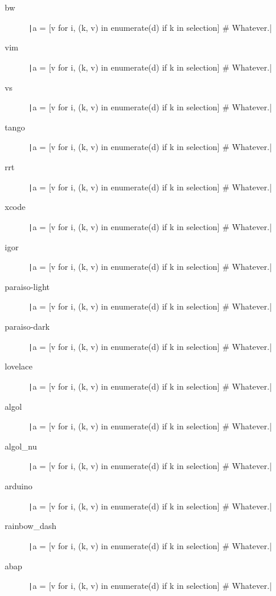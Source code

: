 \begin{description}
  \item[bw]   \texttt|a = [v for i, (k, v) in enumerate(d) if k in selection]  # Whatever.|
  \item[vim]   \texttt|a = [v for i, (k, v) in enumerate(d) if k in selection]  # Whatever.|
  \item[vs]   \texttt|a = [v for i, (k, v) in enumerate(d) if k in selection]  # Whatever.|
  \item[tango]   \texttt|a = [v for i, (k, v) in enumerate(d) if k in selection]  # Whatever.|
  \item[rrt]   \texttt|a = [v for i, (k, v) in enumerate(d) if k in selection]  # Whatever.|
  \item[xcode]   \texttt|a = [v for i, (k, v) in enumerate(d) if k in selection]  # Whatever.|
  \item[igor]   \texttt|a = [v for i, (k, v) in enumerate(d) if k in selection]  # Whatever.|
  \item[paraiso-light]   \texttt|a = [v for i, (k, v) in enumerate(d) if k in selection]  # Whatever.|
  \item[paraiso-dark]   \texttt|a = [v for i, (k, v) in enumerate(d) if k in selection]  # Whatever.|
  \item[lovelace]   \texttt|a = [v for i, (k, v) in enumerate(d) if k in selection]  # Whatever.|
  \item[algol]   \texttt|a = [v for i, (k, v) in enumerate(d) if k in selection]  # Whatever.|
  \item[algol\_nu]   \texttt|a = [v for i, (k, v) in enumerate(d) if k in selection]  # Whatever.|
  \item[arduino]   \texttt|a = [v for i, (k, v) in enumerate(d) if k in selection]  # Whatever.|
  \item[rainbow\_dash]   \texttt|a = [v for i, (k, v) in enumerate(d) if k in selection]  # Whatever.|
  \item[abap]   \texttt|a = [v for i, (k, v) in enumerate(d) if k in selection]  # Whatever.|
\end{description}


